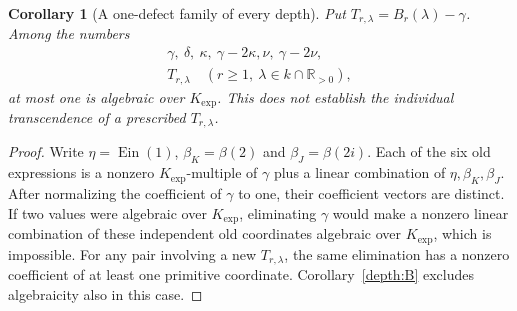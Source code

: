 \documentclass[11pt]{article}
\newtheorem{corollary}[theorem]{Corollary}
\theoremstyle{definition}
\theoremstyle{remark}
\newcommand{\Ein}{\operatorname{Ein}}
\newcommand{\Kexp}{K_{\mathrm{exp}}}
\begin{document}
\begin{corollary}[A one-defect family of every depth]
\label{depth:one-defect}
Put $T_{r,\lambda}=B_r(\lambda)-\gamma$.  Among the numbers
\[
\begin{gathered}
 \gamma,\ \delta,\ \kappa,\ \gamma-2\kappa,
 \nu,\ \gamma-2\nu,\\
 T_{r,\lambda}\quad(r\ge1,\ \lambda\in k\cap\mathbb R_{>0}),
\end{gathered}
\]
at most one is algebraic over $\Kexp$.
This does not establish the individual transcendence of a
prescribed $T_{r,\lambda}$.
\end{corollary}
\begin{proof}
Write $\eta=\Ein(1)$, $\beta_K=\beta(2)$ and
$\beta_J=\beta(2i)$.  Each of the six old expressions is a
nonzero $\Kexp$-multiple of $\gamma$ plus a linear combination
of $\eta,\beta_K,\beta_J$.  After normalizing the coefficient
of $\gamma$ to one, their coefficient vectors are distinct.
If two values were algebraic over $\Kexp$, eliminating $\gamma$
would make a nonzero linear combination of these independent
old coordinates algebraic over $\Kexp$, which is impossible.
For any pair involving a new $T_{r,\lambda}$, the same elimination
has a nonzero coefficient of at least one primitive coordinate.
Corollary~\ref{depth:B} excludes algebraicity also in this case.
\end{proof}
\end{document}
